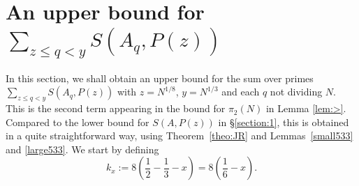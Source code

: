 \documentclass[12pt]{amsart}
\begin{document}
\section{An upper bound for $\sum_{z \le q<y} S(A_q,P(z))$}
\label{section:2}
In this section, we shall obtain an upper bound for the sum over primes $\sum_{z \le q < y} S(A_q,P(z))$ with $z=N^{1/8}$, $y=N^{1/3}$ and each $q$ not dividing $N$. This is the second term appearing in the bound for $\pi_2(N)$ in Lemma \ref{lem:>}. Compared to the lower bound for $S(A,P(z))$ in \S \ref{section:1}, this is obtained in a quite straightforward way, using Theorem~\ref{theo:JR} and Lemmas~\ref{small533} and \ref{large533}.
We start by defining 
\begin{equation} \label{eq: def-k-x}
    k_{x}:=8 \left(\frac{1}{2}-\frac{1}{3}-x \right)=8\left(\frac{1}{6}-x\right).
\end{equation}
\end{document}
